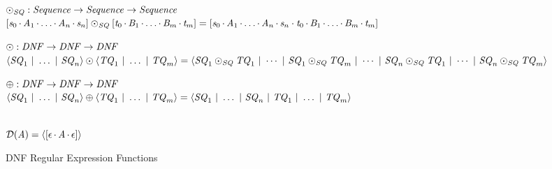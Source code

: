 \documentclass[acmsmall]{acmart}
\begin{document}
\begin{figure}
  \raggedright
  $\odot_{\mathit{SQ}}{} :{} \mathit{Sequence}{} \rightarrow \mathit{Sequence}{} \rightarrow \mathit{Sequence}{}$\\
  $[\mathit{s}_0\mkern-1mu\cdot\mkern-1mu\mathit{A}_1\mkern-1mu\cdot\mkern-1mu\ldots\mkern-1mu\cdot\mkern-1mu\mathit{A}_n\mkern-1mu\cdot\mkern-1mu\mathit{s}_n]\odot_{\mathit{SQ}}[\mathit{t}_0\mkern-1mu\cdot\mkern-1mu\mathit{B}_1\mkern-1mu\cdot\mkern-1mu\ldots\mkern-1mu\cdot\mkern-1mu\mathit{B}_m\mkern-1mu\cdot\mkern-1mu\mathit{t}_m]=
  [\mathit{s}_0\mkern-1mu\cdot\mkern-1mu\mathit{A}_1\mkern-1mu\cdot\mkern-1mu\ldots\mkern-1mu\cdot\mkern-1mu\mathit{A}_n\mkern-1mu\cdot\mkern-1mu\mathit{s}_n\cdot\mathit{t}_0\mkern-1mu\cdot\mkern-1mu\mathit{B}_1\mkern-1mu\cdot\mkern-1mu\ldots\mkern-1mu\cdot\mkern-1mu\mathit{B}_m\mkern-1mu\cdot\mkern-1mu\mathit{t}_m]$\\

  \medskip
  
  $\odot{} :{} \mathit{DNF}{} \rightarrow \mathit{DNF}{} \rightarrow \mathit{DNF}{}$\\
  $\langle\mathit{SQ}_1~|~\ldots~|~\mathit{SQ}_n\rangle\odot\langle\mathit{TQ}_1~|~\ldots~|~\mathit{TQ}_m\rangle=
      \langle \mathit{SQ}_1\odot_{\mathit{SQ}}\mathit{TQ}_1~|~ \cdots
      ~|~ \mathit{SQ}_1\odot_{\mathit{SQ}}\mathit{TQ}_m~|~
      \cdots ~|~ \mathit{SQ}_n\odot_{\mathit{SQ}}\mathit{TQ}_1~|~ \cdots ~|~ \mathit{SQ}_n\odot_{\mathit{SQ}}\mathit{TQ}_m \rangle$
  
  \medskip
  
  $\oplus{} :{}
  \mathit{DNF}{} \rightarrow \mathit{DNF}{} \rightarrow \mathit{DNF}{}
  $\\
  $\langle\mathit{SQ}_1~|~\ldots~|~\mathit{SQ}_n\rangle\oplus\langle\mathit{TQ}_1~|~\ldots~|~\mathit{TQ}_m\rangle =
  \langle\mathit{SQ}_1~|~\ldots~|~\mathit{SQ}_n~|~\mathit{TQ}_1~|~\ldots~|~\mathit{TQ}_m\rangle$
  
  \medskip
  
  \AtomToDNF{} \OfType
  \ArrowTypeOf{\AtomType{}}{\DNFRegexType{}}\\
  $\mathcal{D}(\mathit{A}) = \langle[\epsilon \mkern-1mu\cdot\mkern-1mu \mathit{A} \mkern-1mu\cdot\mkern-1mu
      \epsilon]\rangle$
  \caption{DNF Regular Expression Functions}
  \label{fig:dnf-regex-functions}
\end{figure}
\end{document}
